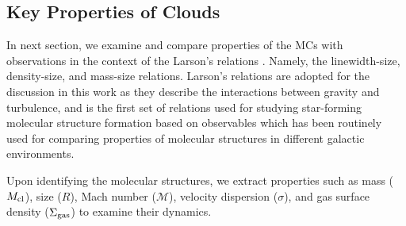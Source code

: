 \IfFileExists{emulateapjlegacy.cls}{\documentclass[iop]{emulateapjlegacy}}{\documentclass[iop]{emulateapj}}
\begin{document}
\subsection{Key Properties of Clouds}  

In next section, we examine and compare properties of the MCs with
observations in the context of the Larson's relations \citep{Larson81a}. 
Namely, the linewidth-size, density-size, and mass-size relations.
Larson's relations are adopted for the discussion in this work as they 
describe the interactions between gravity and turbulence, and is the first set of
relations used for studying star-forming molecular structure formation based on observables
which has been routinely used for comparing properties of molecular structures in different galactic environments.

Upon identifying the molecular structures, we extract properties such as
mass ($M_{\rm cl}$),
size ($R$),
Mach number ($\mathcal{M}$), velocity dispersion ($\sigma$), and
gas surface density ($\Sigma_{\rm gas}$)
to examine their dynamics.
\end{document}
